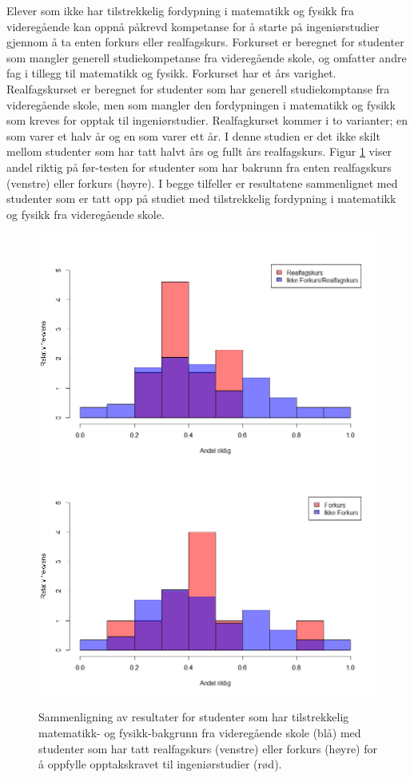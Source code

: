\documentclass[a4paper,norsk,12pt]{article}
\begin{document}
Elever som ikke har tilstrekkelig fordypning i matematikk og fysikk fra videregående kan oppnå påkrevd kompetanse for å starte på ingeniørstudier gjennom å ta enten forkurs eller realfagskurs. Forkurset er beregnet for studenter som mangler generell studiekompetanse fra videregående skole, og omfatter andre fag i tillegg til matematikk og fysikk. Forkurset har et års varighet. Realfagskurset er beregnet for studenter som har generell studiekomptanse fra videregående skole, men som mangler den fordypningen i matematikk og fysikk som kreves for opptak til ingeniørstudier. Realfagkurset kommer i to varianter; en som varer et halv år og en som varer ett år. I denne studien er det ikke skilt mellom studenter som har tatt halvt års og fullt års realfagskurs. Figur \ref{fig:forkurs} viser andel riktig på før-testen for studenter som har bakrunn fra enten realfagskurs (venstre) eller forkurs (høyre). I begge tilfeller er resultatene sammenlignet med studenter som er tatt opp på studiet med tilstrekkelig fordypning i matematikk og fysikk fra videregående skole.
\begin{figure}[tp]
	\includegraphics[width=.48\textwidth]{./real}
	\includegraphics[width=.48\textwidth]{./forkurs}
	\caption{ Sammenligning av resultater for studenter som har tilstrekkelig matematikk- og fysikk-bakgrunn fra videregående skole (blå) med studenter som har tatt realfagskurs (venstre) eller forkurs (høyre) for å oppfylle opptakskravet til ingeniørstudier (rød).}
	\label{fig:forkurs}
\end{figure}
\end{document}

